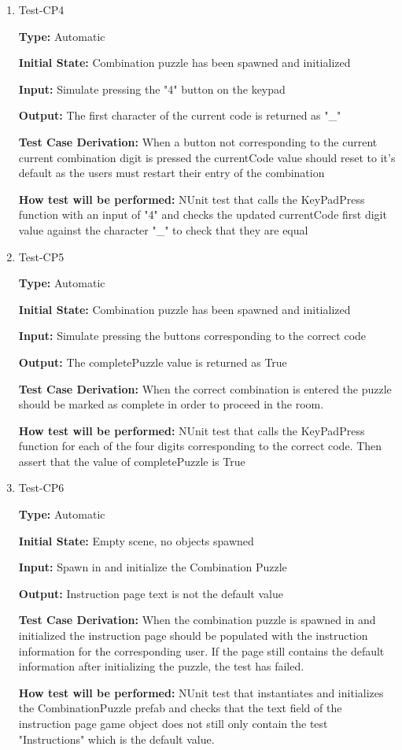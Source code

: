 \documentclass[12pt, titlepage]{article}
\begin{document}
\begin{enumerate}
\item{Test-CP4\\}

\textbf{Type:} Automatic
 
\textbf{Initial State:} Combination puzzle has been spawned and initialized

\textbf{Input:} Simulate pressing the "4" button on the keypad

\textbf{Output:} The first character of the current code is returned as "\_"

\textbf{Test Case Derivation:} When a button not corresponding to the current current combination digit is pressed the currentCode value should reset to it's default as the users must restart their entry of the combination

\textbf{How test will be performed:} NUnit test that calls the KeyPadPress function with an input of "4" and checks the updated currentCode first digit value against the character "\_" to check that they are equal

\item{Test-CP5\\}

\textbf{Type:} Automatic
 
\textbf{Initial State:} Combination puzzle has been spawned and initialized

\textbf{Input:} Simulate pressing the buttons corresponding to the correct code

\textbf{Output:} The completePuzzle value is returned as True

\textbf{Test Case Derivation:} When the correct combination is entered the puzzle should be marked as complete in order to proceed in the room.

\textbf{How test will be performed:} NUnit test that calls the KeyPadPress function for each of the four digits corresponding to the correct code. Then assert that the value of completePuzzle is True

\item{Test-CP6\\}

\textbf{Type:} Automatic
 
\textbf{Initial State:} Empty scene, no objects spawned

\textbf{Input:} Spawn in and initialize the Combination Puzzle

\textbf{Output:} Instruction page text is not the default value

\textbf{Test Case Derivation:} When the combination puzzle is spawned in and initialized the instruction page should be populated with the instruction information for the corresponding user. If the page still contains the default information after initializing the puzzle, the test has failed.

\textbf{How test will be performed:} NUnit test that instantiates and initializes the CombinationPuzzle prefab and checks that the text field of the instruction page game object does not still only contain the test "Instructions" which is the default value.

\end{enumerate}
\end{document}
